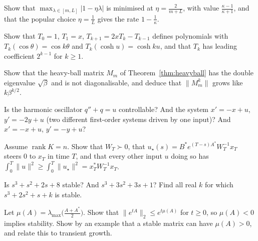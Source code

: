 \begin{exercise}[$\star$]\label{ex:gdstep}
Show that $\max_{\lambda\in[m,L]}|1-\eta\lambda|$ is minimised at $\eta=\frac2{m+L}$, with value $\frac{\kappa-1}{\kappa+1}$, and that the
popular choice $\eta=\frac1L$ gives the rate $1-\frac1\kappa$.
\end{exercise}

\begin{exercise}[$\star\star$]\label{ex:chebyshevrec}
Show that $T_0=1$, $T_1=x$, $T_{k+1}=2xT_k-T_{k-1}$ defines polynomials with $T_k(\cos\theta)=\cos k\theta$ and $T_k(\cosh u)=\cosh ku$, and that
$T_k$ has leading coefficient $2^{k-1}$ for $k\ge1$.
\end{exercise}

\begin{exercise}[$\star\star$]\label{ex:heavyjordan}
Show that the heavy-ball matrix $M_m$ of Theorem~\ref{thm:heavyball} has the double eigenvalue $\sqrt\beta$ and is not diagonalisable,
and deduce that $\|M_m^k\|$ grows like $k\beta^{k/2}$.
\end{exercise}

\begin{exercise}[$\star$]\label{ex:kalmanosc}
Is the harmonic oscillator $q''+q=u$ controllable? And the system $x'=-x+u$, $y'=-2y+u$ (two different first-order systems driven by
one input)? And $x'=-x+u$, $y'=-y+u$?
\end{exercise}

\begin{exercise}[$\star\star$]\label{ex:mininput}
Assume $\operatorname{rank}K=n$. Show that $W_T\succ0$, that $u_\star(s)=B^*e^{(T-s)A^*}W_T^{-1}x_T$ steers $0$ to $x_T$ in time $T$, and that every
other input $u$ doing so has $\int_0^T\|u\|^2\ge\int_0^T\|u_\star\|^2=x_T^*W_T^{-1}x_T$.
\end{exercise}

\begin{exercise}[$\star$]\label{ex:routh}
Is $s^3+s^2+2s+8$ stable? And $s^3+3s^2+3s+1$? Find all real $k$ for which $s^3+2s^2+s+k$ is stable.
\end{exercise}

\begin{exercise}[$\star\star$]\label{ex:lognorm}
Let $\mu(A)=\lambda_{\max}\bigl(\frac{A+A^*}2\bigr)$. Show that $\|e^{tA}\|_2\le e^{t\mu(A)}$ for $t\ge0$, so $\mu(A)<0$ implies stability.
Show by an example that a stable matrix can have $\mu(A)>0$, and relate this to transient growth.
\end{exercise}

